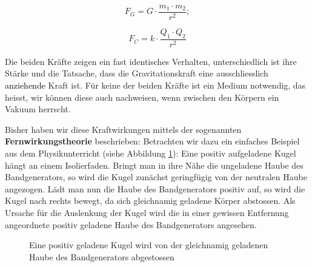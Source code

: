 \documentclass[11pt,twoside=false,open=any]{scrbook}
\begin{document}
    \begin{equation}
	\label{FG}
		F_{G} = G \cdot \frac{m_{1} \cdot m_{2}}{r^{2}};
	\end{equation}
 
	\begin{equation}
	\label{FC}
		F_{C} = k \cdot \frac{Q_{1} \cdot Q_{2}}{r^{2}} 
	\end{equation}

Die beiden Kräfte zeigen ein fast identisches Verhalten, unterschiedlich ist ihre Stärke und die Tatsache, dass die Gravitationskraft eine ausschliesslich \textcolor{black}{anziehende} Kraft ist. Für keine der beiden Kräfte ist ein Medium notwendig, das heisst, wir können diese auch nachweisen, wenn zwischen den Körpern ein Vakuum herrscht. 

Bisher haben wir diese Kraftwirkungen mittels der sogenannten \textbf{Fernwirkungstheorie} beschrieben: Betrachten wir dazu ein einfaches Beispiel aus dem Physikunterricht (siehe Abbildung \ref{Bsp1}): Eine positiv aufgeladene Kugel hängt an einem Isolierfaden.
Bringt man in ihre Nähe die ungeladene Haube des Bandgenerators, so wird die Kugel zunächst geringfügig von der neutralen Haube angezogen. Lädt man nun die Haube des Bandgenerators positiv auf, so wird die Kugel nach rechts bewegt, da sich gleichnamig geladene Körper abstossen. Als Ursache für die Auslenkung der Kugel wird die in einer gewissen Entfernung  angeordnete positiv geladene Haube des Bandgenerators angesehen. 

\begin{figure}[h]
\begin{center}
\caption{Eine positiv geladene Kugel wird von der gleichnamig geladenen Haube des Bandgenerators abgestossen}
\label{Bsp1}
\end{center}
\end{figure}
\end{document}
